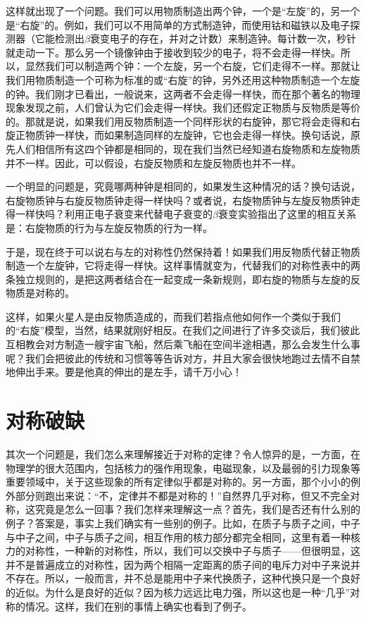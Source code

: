 这样就出现了一个问题。我们可以用物质制造出两个钟，一个是“左旋”的，另一个是“右旋”的。例如，我们可以不用简单的方式制造钟，而使用钴和磁铁以及电子探测器（它能检测出$\beta$衰变电子的存在，并对之计数）来制造钟。每计数一次，秒针就走动一下。那么另一个镜像钟由于接收到较少的电子，将不会走得一样快。所以，显然我们可以制造两个钟：一个左旋，另一个右旋，它们走得不一样。那就让我们用物质制造一个可称为标准的或“右旋”的钟，另外还用这种物质制造一个左旋的钟。我们刚才已看出，一般说来，这两者不会走得一样快，而在那个著名的物理现象发现之前，人们曾认为它们会走得一样快。我们还假定正物质与反物质是等价的。那就是说，如果我们用反物质制造一个同样形状的右旋钟，那它将会走得和右旋正物质钟一样快，而如果制造同样的左旋钟，它也会走得一样快。换句话说，原先人们相信所有这四个钟都是相同的，现在我们当然已经知道右旋物质和左旋物质并不一样。因此，可以假设，右旋反物质和左旋反物质也并不一样。

一个明显的问题是，究竟哪两种钟是相同的，如果发生这种情况的话？换句话说，右旋物质钟与右旋反物质钟走得一样快吗？或者说，右旋物质钟与左旋反物质钟走得一样快吗？利用正电子衰变来代替电子衰变的$\beta$衰变实验指出了这里的相互关系是：右旋物质的行为与左旋反物质的行为一样。

于是，现在终于可以说右与左的对称性仍然保持着！如果我们用反物质代替正物质制造一个左旋钟，它将走得一样快。这样事情就变为，代替我们的对称性表中的两条独立规则的，是把这两者结合在一起变成一条新规则，即右旋的物质与左旋的反物质是对称的。

这样，如果火星人是由反物质造成的，而我们若指点他如何作一个类似于我们的“右旋”模型，当然，结果就刚好相反。在我们之间进行了许多交谈后，我们彼此互相教会对方制造一艘宇宙飞船，然后乘飞船在空间半途相遇，那么会发生什么事呢？我们会把彼此的传统和习惯等等告诉对方，并且大家会很快地跑过去情不自禁地伸出手来。要是他真的伸出的是左手，请千万小心！

\section{对称破缺}

其次一个问题是，我们怎么来理解接近于对称的定律？令人惊异的是，一方面，在物理学的很大范围内，包括核力的强作用现象，电磁现象，以及最弱的引力现象等重要领域中，关于这些现象的所有定律似乎都是对称的。另一方面，那个小小的例外部分则跑出来说：“不，定律并不都是对称的！”自然界几乎对称，但又不完全对称，这究竟是怎么一回事？我们怎样来理解这一点？首先，我们是否还有什么别的例子？答案是，事实上我们确实有一些别的例子。比如，在质子与质子之间，中子与中子之间，中子与质子之间，相互作用的核力部分都完全相同，这里有着一种核力的对称性，一种新的对称性，所以，我们可以交换中子与质子——但很明显，这并不是普遍成立的对称性，因为两个相隔一定距离的质子间的电斥力对中子来说并不存在。所以，一般而言，并不总是能用中子来代换质子，这种代换只是一个良好的近似。为什么是良好的近似？因为核力远远比电力强，所以这也是一种“几乎”对称的情况。这样，我们在别的事情上确实也看到了例子。

